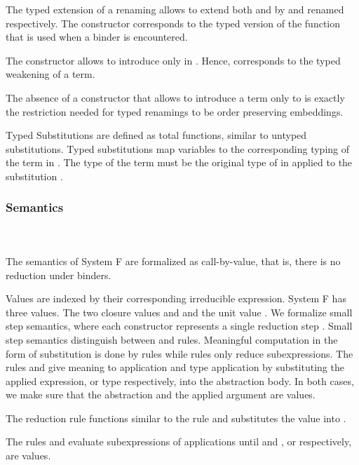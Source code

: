 \noindent The typed extension of a renaming  allows to extend both  and  by  and renamed  respectively. 
The constructor  corresponds to the typed version of the function  that is used when a binder is encountered. 

\noindent The constructor  allows to introduce  only in . 
Hence,  corresponds to the typed weakening of a term.

\noindent The absence of a constructor that allows to introduce a term only to  is exactly the restriction needed for typed renamings to be order preserving embeddings.

\noindent Typed Substitutions are defined as total functions, similar to untyped substitutions.
\FSubTyping
Typed substitutions  map variables    to the corresponding typing of the term  in . 
The type of the term  must be the original type of  in  applied to the substitution .
\subsubsection{Semantics}\hfill\\\\
The semantics of System F are formalized as call-by-value, that is, there is no reduction under binders. 

\noindent Values are indexed by their corresponding irreducible expression.
\FVal
System F has three values. 
The two closure values  and  and the unit value .
We formalize small step semantics, where each constructor represents a single reduction step   .
Small step semantics distinguish between  and  rules. 
Meaningful computation in the form of substitution is done by  rules while  rules only reduce subexpressions.
\FSemantics
The rules  and  give meaning to application and type application by substituting the applied expression, or type respectively, into the abstraction body. 
In both cases, we make sure that the abstraction and the applied argument are values.

\noindent The reduction rule  functions similar to the rule  and substitutes the value  into . 

\noindent The rules  and  evaluate subexpressions of applications until  and , or  respectively, are values. 

